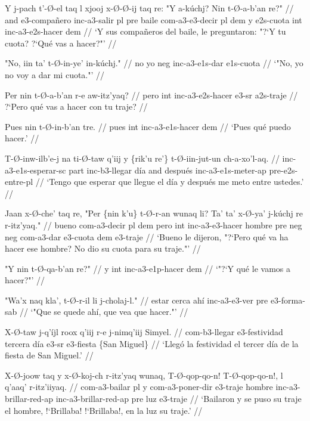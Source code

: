 \documentclass[12pt]{article}
\begin{document}
\ex
\begingl
  \gla Y j-pach t'-\O-el taq l xjooj x-\O-\O-ij taq re: "Y a-k\'uchj? Nin t-\O-a-b'an re?" //
  \glb and e3-compa\~nero inc-a3-salir pl pre baile com-a3-e3-decir pl dem y e2s-cuota int inc-a3-e2s-hacer dem  //
  \glft `Y sus compa\~neros del baile, le preguntaron: "?`Y tu cuota? ?`Qu\'e vas a hacer?"' //
\endgl
\xe

\ex
\begingl
  \gla "No, iin ta' t-\O-in-ye' in-k\'uchj." //
  \glb  no yo neg inc-a3-e1s-dar e1s-cuota //
  \glft `"No, yo no voy a dar mi cuota."' //
\endgl
\xe


\ex
\begingl
  \gla  Per nin t-\O-a-b'an r-e aw-itz'yaq? //
  \glb pero int inc-a3-e2s-hacer e3-sr a2s-traje //
  \glft ?`Pero qu\'e vas a hacer con tu traje? //
\endgl
\xe

\ex
\begingl
  \gla  Pues nin t-\O-in-b'an tre. //
  \glb pues int inc-a3-e1s-hacer dem //
  \glft `Pues qu\'e puedo hacer.' //
\endgl
\xe

\ex
\begingl
  \gla  T-\O-inw-ilb'e-j na ti-\O-taw q'iij y \{rik'u re'\} t-\O-iin-jut-un ch-a-xo'l-aq. //
  \glb inc-a3-e1s-esperar-sc part inc-b3-llegar d\'ia and despu\'es inc-a3-e1s-meter-ap pre-e2s-entre-pl  //
  \glft `Tengo que esperar que llegue el d\'ia y despu\'es me meto entre ustedes.' //
\endgl
\xe

\ex
\begingl
  \gla Jaan x-\O-che' taq re, "Per \{nin k'u\} t-\O-r-an wunaq li? Ta' ta' x-\O-ya' j-k\'uchj re r-itz'yaq." //
  \glb bueno com-a3-decir pl dem pero int inc-a3-e3-hacer hombre pre neg neg com-a3-dar e3-cuota dem e3-traje //
  \glft `Bueno le dijeron, "?`Pero qu\'e va ha hacer ese hombre? No dio su cuota para su traje."' //
\endgl
\xe

\ex
\begingl
  \gla "Y nin t-\O-qa-b'an re?" //
  \glb y int inc-a3-e1p-hacer dem //
  \glft `"?`Y qu\'e le vamos a hacer?"' //
\endgl
\xe

\ex
\begingl
  \gla  "Wa'x naq kla', t-\O-r-il li j-cholaj-l." //
  \glb estar cerca ah\'i inc-a3-e3-ver pre e3-forma-sab //
  \glft `"Que se quede ah\'i, que vea que hacer."' //
\endgl
\xe


\ex
\begingl
  \gla  X-\O-taw j-q'\'ijl roox q'iij r-e j-nimq'iij Simyel. //
  \glb com-b3-llegar e3-festividad tercera d\'ia e3-sr e3-fiesta \{San Miguel\} //
  \glft `Lleg\'o la festividad el tercer d\'ia de la fiesta de San Miguel.' //
\endgl
\xe

\ex
\begingl
  \gla  X-\O-joow taq y x-\O-koj-ch r-itz'yaq wunaq, T-\O-qop-qo-n! T-\O-qop-qo-n!, l q'aaq' r-itz'iiyaq. //   %
  \glb com-a3-bailar pl y com-a3-poner-dir e3-traje hombre inc-a3-brillar-red-ap inc-a3-brillar-red-ap pre luz e3-traje //
  \glft `Bailaron y se puso su traje el hombre, !`Brillaba! !`Brillaba!, en la luz su traje.'  //
\endgl
\xe
\end{document}
